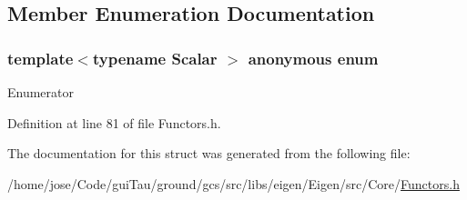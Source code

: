 \subsection{Member Enumeration Documentation}
\hypertarget{structei__functor__traits_3_01ei__scalar__min__op_3_01_scalar_01_4_01_4_a030f44e4446e5a1c87794b44701c6a10}{\subsubsection[{anonymous enum}]{\setlength{\rightskip}{0pt plus 5cm}template$<$typename Scalar $>$ anonymous enum}}\label{structei__functor__traits_3_01ei__scalar__min__op_3_01_scalar_01_4_01_4_a030f44e4446e5a1c87794b44701c6a10}
\begin{Desc}
\item[Enumerator]\par
\begin{description}
\item[{\em 
\hypertarget{structei__functor__traits_3_01ei__scalar__min__op_3_01_scalar_01_4_01_4_a030f44e4446e5a1c87794b44701c6a10a5c61e010465c368ffe4924a35c922685}{Cost}\label{structei__functor__traits_3_01ei__scalar__min__op_3_01_scalar_01_4_01_4_a030f44e4446e5a1c87794b44701c6a10a5c61e010465c368ffe4924a35c922685}
}]\end{description}
\end{Desc}


Definition at line 81 of file Functors.\-h.



The documentation for this struct was generated from the following file\-:\begin{DoxyCompactItemize}
\item 
/home/jose/\-Code/gui\-Tau/ground/gcs/src/libs/eigen/\-Eigen/src/\-Core/\hyperlink{_core_2_functors_8h}{Functors.\-h}\end{DoxyCompactItemize}
